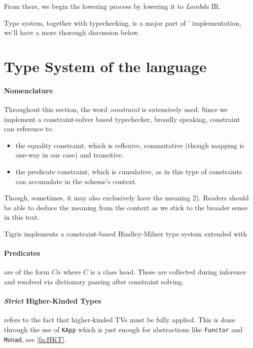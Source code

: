 \documentclass[a4paper, 11pt]{article}
\theoremstyle{remark}\newtheorem*{remark}{Remark}
\theoremstyle{definition}\newtheorem*{definition}{Definition}
\begin{document}
From there, we begin the lowering process by lowering it to \emph{Lambda} IR.

Type system, together with typechecking, is a major part of \Tigris' implementation, we'll have a more thorough discussion below.
\section{Type System of the \Tigris language}

\paragraph{Nomenclature} Throughout this section, the word \emph{constraint} is extensively used. Since we implement a constraint-solver based typechecker,
broadly speaking, constraint can reference to
\begin{itemize}
  \item the equality constraint, which is reflexive, commutative (though mapping is one-way in our case) and transitive.
  \item the predicate constraint, which is cumulative, as in this type of constraints can accumulate
    in the scheme's context.
\end{itemize}
Though, sometimes, it may also exclusively have the meaning 2). Readers should be able to
deduce the meaning from the context as we stick to the broader sense in this text.

Tigris implements a constraint-based Hindley-Milner type system extended with
\paragraph{Predicates} are of the form \(C \bar{\alpha}\) where \(C\) is a class head.
These are collected during inference and resolved via dictionary passing after constraint solving.
\paragraph{\emph{Strict} Higher-Kinded Types} refers to the fact that higher-kinded TVs
must be fully applied. This is done through the use of \texttt{KApp} which is just enough
for abstractions like \texttt{Functor} and \texttt{Monad}, see \autoref{fn:HKT}.
\end{document}
